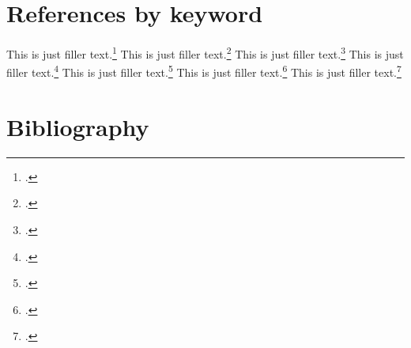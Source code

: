 \documentclass[a4paper,oneside]{book}
\begin{document}
\chapter{References by keyword}

This is just filler text.\footcite{aristotle:anima}
This is just filler text.\footcite{nussbaum}
This is just filler text.\footcite{averroes/bland}
This is just filler text.\footcite{hyman}
This is just filler text.\footcite{aristotle:physics}
This is just filler text.\footcite{moraux}
This is just filler text.\footcite{pines}

\chapter*{Bibliography}
\printbibliography[heading=primary,keyword=primary]
\printbibliography[heading=secondary,keyword=secondary]
\end{document}
